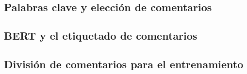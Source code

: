 \subsection{Palabras clave y elección de comentarios}

\subsection{BERT y el etiquetado de comentarios}

\subsection{División de comentarios para el entrenamiento}







